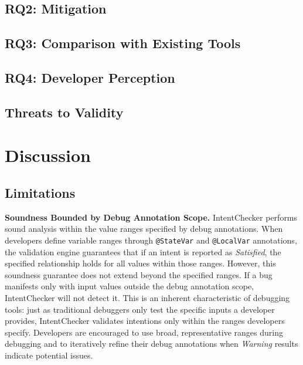 \documentclass[pdflatex,sn-basic]{sn-jnl}%
\theoremstyle{thmstyleone}%
\theoremstyle{thmstyletwo}%
\theoremstyle{thmstylethree}%
\begin{document}
\subsection{RQ2: Mitigation}

\subsection{RQ3: Comparison with Existing Tools}\label{sec:rq3}

\subsection{RQ4: Developer Perception}\label{sec:rq4}


\subsection{Threats to Validity}


\section{Discussion}\label{sec:discussion}

\subsection{Limitations}

\noindent\textbf{Soundness Bounded by Debug Annotation Scope.}
IntentChecker performs sound analysis within the value ranges specified by debug annotations.
When developers define variable ranges through \texttt{@StateVar} and \texttt{@LocalVar} annotations,
the validation engine guarantees that if an intent is reported as \textit{Satisfied},
the specified relationship holds for all values within those ranges.
However, this soundness guarantee does not extend beyond the specified ranges.
If a bug manifests only with input values outside the debug annotation scope,
IntentChecker will not detect it.
This is an inherent characteristic of debugging tools:
just as traditional debuggers only test the specific inputs a developer provides,
IntentChecker validates intentions only within the ranges developers specify.
Developers are encouraged to use broad, representative ranges during debugging
and to iteratively refine their debug annotations when \textit{Warning} results indicate potential issues.
\end{document}
